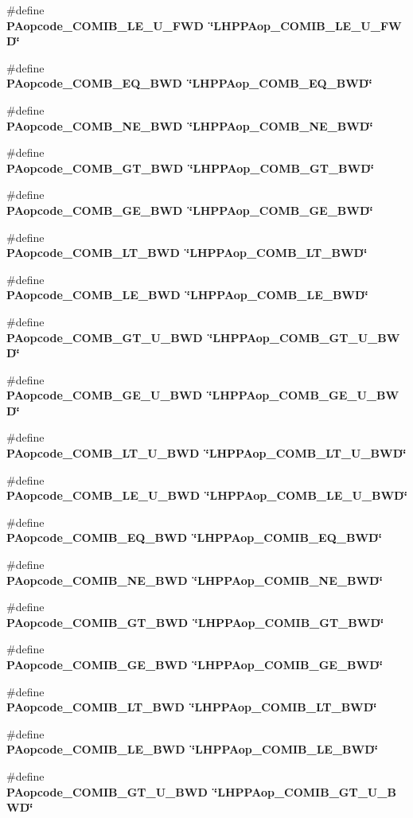 \begin{CompactItemize}
\item 
\#define \bf{PAopcode\_\-COMIB\_\-LE\_\-U\_\-FWD}~\char`\"{}LHPPAop\_\-COMIB\_\-LE\_\-U\_\-FWD\char`\"{}
\item 
\#define \bf{PAopcode\_\-COMB\_\-EQ\_\-BWD}~\char`\"{}LHPPAop\_\-COMB\_\-EQ\_\-BWD\char`\"{}
\item 
\#define \bf{PAopcode\_\-COMB\_\-NE\_\-BWD}~\char`\"{}LHPPAop\_\-COMB\_\-NE\_\-BWD\char`\"{}
\item 
\#define \bf{PAopcode\_\-COMB\_\-GT\_\-BWD}~\char`\"{}LHPPAop\_\-COMB\_\-GT\_\-BWD\char`\"{}
\item 
\#define \bf{PAopcode\_\-COMB\_\-GE\_\-BWD}~\char`\"{}LHPPAop\_\-COMB\_\-GE\_\-BWD\char`\"{}
\item 
\#define \bf{PAopcode\_\-COMB\_\-LT\_\-BWD}~\char`\"{}LHPPAop\_\-COMB\_\-LT\_\-BWD\char`\"{}
\item 
\#define \bf{PAopcode\_\-COMB\_\-LE\_\-BWD}~\char`\"{}LHPPAop\_\-COMB\_\-LE\_\-BWD\char`\"{}
\item 
\#define \bf{PAopcode\_\-COMB\_\-GT\_\-U\_\-BWD}~\char`\"{}LHPPAop\_\-COMB\_\-GT\_\-U\_\-BWD\char`\"{}
\item 
\#define \bf{PAopcode\_\-COMB\_\-GE\_\-U\_\-BWD}~\char`\"{}LHPPAop\_\-COMB\_\-GE\_\-U\_\-BWD\char`\"{}
\item 
\#define \bf{PAopcode\_\-COMB\_\-LT\_\-U\_\-BWD}~\char`\"{}LHPPAop\_\-COMB\_\-LT\_\-U\_\-BWD\char`\"{}
\item 
\#define \bf{PAopcode\_\-COMB\_\-LE\_\-U\_\-BWD}~\char`\"{}LHPPAop\_\-COMB\_\-LE\_\-U\_\-BWD\char`\"{}
\item 
\#define \bf{PAopcode\_\-COMIB\_\-EQ\_\-BWD}~\char`\"{}LHPPAop\_\-COMIB\_\-EQ\_\-BWD\char`\"{}
\item 
\#define \bf{PAopcode\_\-COMIB\_\-NE\_\-BWD}~\char`\"{}LHPPAop\_\-COMIB\_\-NE\_\-BWD\char`\"{}
\item 
\#define \bf{PAopcode\_\-COMIB\_\-GT\_\-BWD}~\char`\"{}LHPPAop\_\-COMIB\_\-GT\_\-BWD\char`\"{}
\item 
\#define \bf{PAopcode\_\-COMIB\_\-GE\_\-BWD}~\char`\"{}LHPPAop\_\-COMIB\_\-GE\_\-BWD\char`\"{}
\item 
\#define \bf{PAopcode\_\-COMIB\_\-LT\_\-BWD}~\char`\"{}LHPPAop\_\-COMIB\_\-LT\_\-BWD\char`\"{}
\item 
\#define \bf{PAopcode\_\-COMIB\_\-LE\_\-BWD}~\char`\"{}LHPPAop\_\-COMIB\_\-LE\_\-BWD\char`\"{}
\item 
\#define \bf{PAopcode\_\-COMIB\_\-GT\_\-U\_\-BWD}~\char`\"{}LHPPAop\_\-COMIB\_\-GT\_\-U\_\-BWD\char`\"{}
\item 

\end{CompactItemize}
